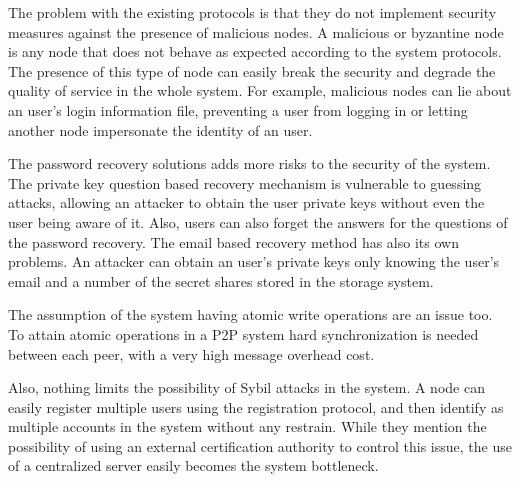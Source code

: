 %



The problem with the existing protocols is that they do not implement security measures against the presence of malicious nodes.
A malicious or byzantine node is any node that does
not behave as expected according to the system protocols. The presence of this type
of node can easily break the security and degrade the quality of
service in the whole system. For example, malicious nodes can lie about an user's login
information file, preventing a user from logging in or letting another node
impersonate the identity of an user.

The password recovery solutions adds more risks to the security of the system.
The private key question based recovery mechanism is vulnerable to guessing
attacks, allowing an attacker to obtain the user private keys without even the user
being aware of it. Also, users can also forget the answers for the questions of
the password recovery. The email based recovery method has also its own
problems. An attacker can obtain an user's private keys only knowing the user's
email and a number of the secret shares stored in the storage system. 

The assumption of the system having atomic write operations are an issue too.
To attain atomic operations in a P2P system hard synchronization is
needed between each peer, with a very high message overhead cost.

Also, nothing limits the possibility of Sybil attacks in the system. A node can
easily register multiple users using the registration protocol, and then identify as multiple
accounts in the system without any restrain. While they mention the possibility
of using an external certification authority to control this issue, the use of a
centralized server easily becomes the system bottleneck.


